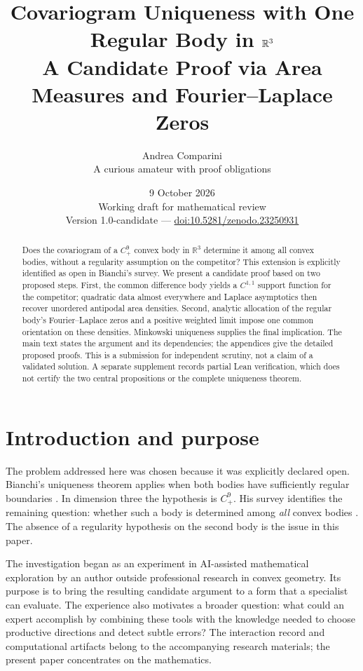 \documentclass[11pt,a4paper]{article}
\title{Covariogram Uniqueness with One Regular Body in $\R^3$\\[3pt]
\large A Candidate Proof via Area Measures and Fourier--Laplace Zeros}
\author{Andrea Comparini\\[2pt]\small A curious amateur with proof obligations}
\date{9 October 2026\\\small Working draft for mathematical review\\
\small Version 1.0-candidate --- \href{https://doi.org/10.5281/zenodo.23250931}{doi:10.5281/zenodo.23250931}}
\theoremstyle{definition}
\theoremstyle{remark}
\newcommand{\R}{\mathbb R}
\numberwithin{equation}{section}
\begin{document}
\maketitle
\begin{abstract}
Does the covariogram of a $C^9_+$ convex body in $\R^3$ determine it among
all convex bodies, without a regularity assumption on the competitor?
This extension is explicitly identified as open in Bianchi's survey.
We present a candidate proof based on two proposed steps. First, the common
difference body yields a $C^{1,1}$ support function for the competitor;
quadratic data almost everywhere and Laplace asymptotics then recover
unordered antipodal area densities. Second, analytic allocation of the
regular body's Fourier--Laplace zeros and a positive weighted limit impose
one common orientation on these densities. Minkowski uniqueness supplies
the final implication. The main text states the argument and its dependencies;
the appendices give the detailed proposed proofs. This is a submission for
independent scrutiny, not a claim of a validated solution. A separate
supplement records partial Lean verification, which does not certify the
two central propositions or the complete uniqueness theorem.
\end{abstract}

\section{Introduction and purpose}\label{sec:introduction}
The problem addressed here was chosen because it was explicitly declared
open. Bianchi's uniqueness theorem applies when both bodies have sufficiently
regular boundaries \cite[Theorem~1.1 and Remark~5.2]{Bianchi2016}. In dimension
three the hypothesis is $C^9_+$. His survey identifies the remaining question:
whether such a body is determined among \emph{all} convex bodies
\cite[discussion following Theorem~3.25, manuscript p.~23]{Bianchi2023}.
The absence of a regularity hypothesis on the second body is the issue in
this paper.

The investigation began as an experiment in AI-assisted mathematical
exploration by an author outside professional research in convex geometry.
Its purpose is to bring the resulting candidate argument to a form that
a specialist can evaluate. The experience also motivates a broader question:
what could an expert accomplish by combining these tools with the knowledge
needed to choose productive directions and detect subtle errors?
The interaction record and computational artifacts belong to the accompanying
research materials; the present paper concentrates on the mathematics.
\end{document}
